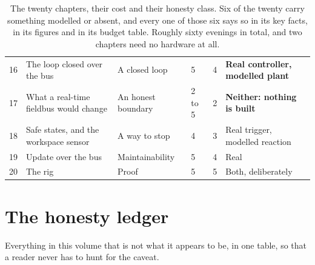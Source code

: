 \begin{table}[H]
\begin{tabular}{p{5mm}p{54mm}p{30mm}p{8mm}p{10mm}p{34mm}}
16 & The loop closed over the bus & A closed loop & 5 & 4 & \textbf{Real controller, modelled plant} \\
17 & What a real-time fieldbus would change & An honest boundary & 2 to 5 & 2 & \textbf{Neither: nothing is built} \\
18 & Safe states, and the workspace sensor & A way to stop & 4 & 3 & Real trigger, modelled reaction \\
19 & Update over the bus & Maintainability & 5 & 4 & Real \\
20 & The rig & Proof & 5 & 5 & Both, deliberately \\
\bottomrule
\end{tabular}
\caption{The twenty chapters, their cost and their honesty class. Six of the twenty carry something modelled or absent, and every one of those six says so in its key facts, in its figures and in its budget table. Roughly sixty evenings in total, and two chapters need no hardware at all.}
\end{table}

\section{The honesty ledger}

Everything in this volume that is not what it appears to be, in one table, so
that a reader never has to hunt for the caveat.

